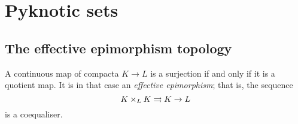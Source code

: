 
\section{Pyknotic sets}

\subsection{The effective epimorphism topology}

\begin{cnstr}
	A continuous map of compacta $ K \to L $ is a surjection if and only if it is a quotient map.
	It is in that case an \emph{effective epimorphism};
	that is, the sequence
	\[
		K \times_L K \rightrightarrows K \to L
	\]
	is a coequaliser.
\end{cnstr}




